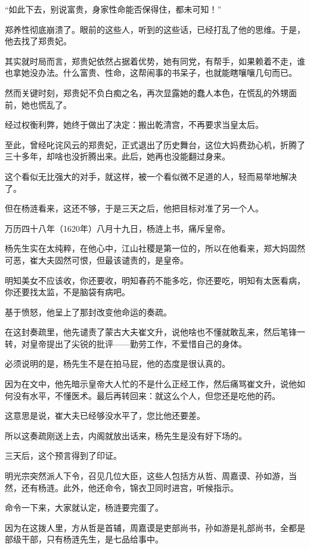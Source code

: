 \begin{multicols}{\theparacolNo}
“如此下去，别说富贵，身家性命能否保得住，都未可知！”

郑养性彻底崩溃了。眼前的这些人，听到的这些话，已经打乱了他的思维。于是，他去找了郑贵妃。

其实就时局而言，郑贵妃依然占据着优势，她有同党，有帮手，如果赖着不走，谁也拿她没办法。什么富贵、性命，这帮闹事的书呆子，也就能瞎嚷嚷几句而已。

然而关键时刻，郑贵妃不负白痴之名，再次显露她的蠢人本色，在慌乱的外甥面前，她也慌乱了。

经过权衡利弊，她终于做出了决定：搬出乾清宫，不再要求当皇太后。

至此，曾经叱诧风云的郑贵妃，正式退出了历史舞台，这位大妈费劲心机，折腾了三十多年，却啥也没折腾出来。此后，她再也没能翻过身来。

这个看似无比强大的对手，就这样，被一个看似微不足道的人，轻而易举地解决了。

但在杨涟看来，这还不够，于是三天之后，他把目标对准了另一个人。

万历四十八年（1620年）八月十九日，杨涟上书，痛斥皇帝。

杨先生实在太纯粹，在他心中，江山社稷是第一位的，所以在他看来，郑大妈固然可恶，崔大夫固然可恨，但最该谴责的，是皇帝。

明知美女不应该收，你还要收，明知春药不能多吃，你还要吃，明知有太医看病，你还要找太监，不是脑袋有病吧。

基于愤怒，他呈上了那封改变他命运的奏疏。

在这封奏疏里，他先谴责了蒙古大夫崔文升，说他啥也不懂就敢乱来，然后笔锋一转，对皇帝提出了尖锐的批评——勤劳工作，不爱惜自己的身体。

必须说明的是，杨先生不是在拍马屁，他的态度是很认真的。

因为在文中，他先暗示皇帝大人忙的不是什么正经工作，然后痛骂崔文升，说他如何没有水平，不懂医术。最后再转回来：就这么个人，但您还是吃他的药。

这意思是说，崔大夫已经够没水平了，您比他还要差。

所以这奏疏刚送上去，内阁就放出话来，杨先生是没有好下场的。

三天后，这个预言得到了印证。

明光宗突然派人下令，召见几位大臣，这些人包括方从哲、周嘉谟、孙如游，当然，还有杨涟。此外，他还命令，锦衣卫同时进宫，听候指示。

命令一下来，大家就认定，杨涟要完蛋了。

因为在这拨人里，方从哲是首辅，周嘉谟是吏部尚书，孙如游是礼部尚书，全都是部级干部，只有杨涟先生，是七品给事中。


\end{multicols}
